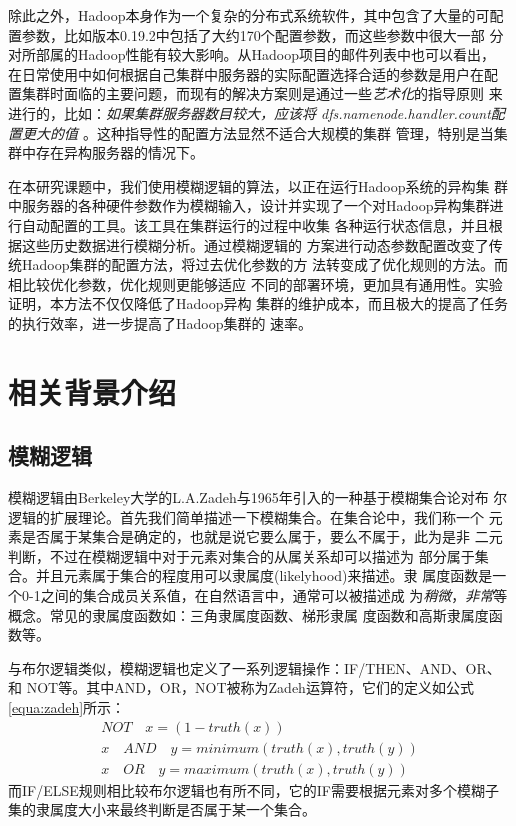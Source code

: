 除此之外，Hadoop本身作为一个复杂的分布式系统软件，其中包含了大量的可配
置参数，比如版本0.19.2中包括了大约170个配置参数，而这些参数中很大一部
分对所部属的Hadoop性能有较大影响。从Hadoop项目的邮件列表中也可以看出，
在日常使用中如何根据自己集群中服务器的实际配置选择合适的参数是用户在配
置集群时面临的主要问题，而现有的解决方案则是通过一些\textit{艺术化}的指导原则
来进行的\cite{hadooptuning}，比如：\textit{如果集群服务器数目较大，应该将
dfs.namenode.handler.count配置更大的值
\cite{hadoopconfexample}}。这种指导性的配置方法显然不适合大规模的集群
管理，特别是当集群中存在异构服务器的情况下。


在本研究课题中，我们使用模糊逻辑的算法，以正在运行Hadoop系统的异构集
群中服务器的各种硬件参数作为模糊输入，设计并实现了一个对Hadoop异构集群进行自动配置的工具。该工具在集群运行的过程中收集
各种运行状态信息，并且根据这些历史数据进行模糊分析。通过模糊逻辑的
方案进行动态参数配置改变了传统Hadoop集群的配置方法，将过去优化参数的方
法转变成了优化规则的方法。而相比较优化参数，优化规则更能够适应
不同的部署环境，更加具有通用性。实验证明，本方法不仅仅降低了Hadoop异构
集群的维护成本，而且极大的提高了任务的执行效率，进一步提高了Hadoop集群的
速率。

\section{相关背景介绍}

\subsection{模糊逻辑}
模糊逻辑由Berkeley大学的L.A.Zadeh与1965年引入的一种基于模糊集合论对布
尔逻辑的扩展理论。首先我们简单描述一下模糊集合。在集合论中，我们称一个
元素是否属于某集合是确定的，也就是说它要么属于，要么不属于，此为是非
二元判断，不过在模糊逻辑中对于元素对集合的从属关系却可以描述为
部分属于集合。并且元素属于集合的程度用可以隶属度(likelyhood)来描述。隶
属度函数是一个0-1之间的集合成员关系值，在自然语言中，通常可以被描述成
为\textit{稍微}，\textit{非常}等概念。常见的隶属度函数如：三角隶属度函数、梯形隶属
度函数和高斯隶属度函数等。

与布尔逻辑类似，模糊逻辑也定义了一系列逻辑操作：IF/THEN、AND、OR、和
NOT等。其中AND，OR，NOT被称为Zadeh运算符\cite{klir1995fuzzy}，它们的定义如公式
\ref{equa:zadeh}所示：
\begin{equation}
  \label{equa:zadeh}
  \begin{split}
    NOT\quad x = (1 - truth(x))\\
    x\quad AND\quad y = minimum(truth(x), truth(y))\\
    x\quad OR\quad y = maximum(truth(x), truth(y))
  \end{split}
\end{equation}
而IF/ELSE规则相比较布尔逻辑也有所不同，它的IF需要根据元素对多个模糊子
集的隶属度大小来最终判断是否属于某一个集合。

